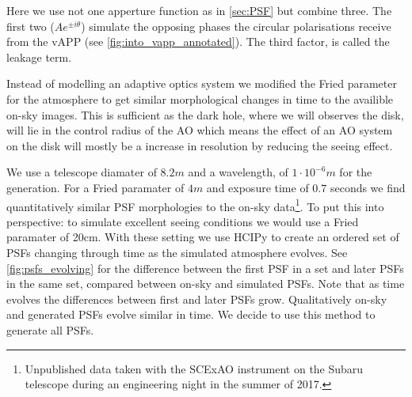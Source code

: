 Here we use not one apperture function as in \autoref{sec:PSF} but combine three. The first two ($Ae^{\pm i\theta}$) simulate the opposing phases the circular polarisations receive from the \ac{vAPP} (see \autoref{fig:into_vapp_annotated}). The third factor, is called the leakage term.

Instead of modelling an adaptive optics system we modified the Fried parameter for the atmosphere to get similar morphological changes in time to the availible on-sky images. This is sufficient as the dark hole, where we will observes the disk, will lie in the control radius of the \ac{AO} which means the effect of an \ac{AO} system on the disk will mostly be a increase in resolution by reducing the seeing effect.

We use a telescope diamater of $8.2m$ and a wavelength, of $1\cdot 10^{-6}m$ for the generation. For a Fried paramater of $4m$ and exposure time of $0.7$ seconds we find quantitatively similar \ac{PSF} morphologies to the on-sky data\footnote{Unpublished data taken with the SCExAO instrument on the Subaru telescope during an engineering night in the summer of 2017.}. To put this into perspective: to simulate excellent seeing conditions we would use a Fried paramater of 20cm. With these setting we use \ac{HCIPy} to create an ordered set of \acp{PSF} changing through time as the simulated atmosphere evolves. See \autoref{fig:psfs_evolving} for the difference between the first \ac{PSF} in a set and later \acp{PSF} in the same set, compared between on-sky and simulated \acp{PSF}. Note that as time evolves the differences between first and later \acp{PSF} grow. Qualitatively on-sky and generated \acp{PSF} evolve similar in time. We decide to use this method to generate all \acp{PSF}.



